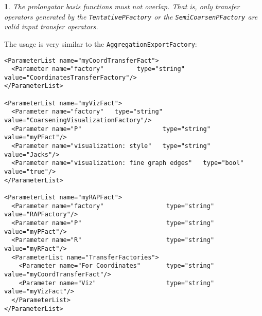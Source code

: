 \documentclass[10pt,fleqn]{book}
\newtheorem*{mycomment}{\ding{42}}
\begin{document}
\begin{mycomment}
The prolongator basis functions must not overlap. That is, only transfer operators generated by the \verb|TentativePFactory| or the \verb|SemiCoarsenPFactory| are valid input transfer operators.
\end{mycomment}

The usage is very similar to the \verb|AggregationExportFactory|:
\begin{lstlisting}
<ParameterList name="myCoordTransferFact">
  <Parameter name="factory"         type="string" value="CoordinatesTransferFactory"/>
</ParameterList>

<ParameterList name="myVizFact">
  <Parameter name="factory"   type="string" value="CoarseningVisualizationFactory"/>
  <Parameter name="P"                      type="string" value="myPFact"/>
  <Parameter name="visualization: style"   type="string" value="Jacks"/>
  <Parameter name="visualization: fine graph edges"   type="bool" value="true"/>
</ParameterList>

<ParameterList name="myRAPFact">
  <Parameter name="factory"                 type="string" value="RAPFactory"/>
  <Parameter name="P"                       type="string" value="myPFact"/>
  <Parameter name="R"                       type="string" value="myRFact"/>
  <ParameterList name="TransferFactories">
    <Parameter name="For Coordinates"       type="string" value="myCoordTransferFact"/>
    <Parameter name="Viz"                   type="string" value="myVizFact"/>
  </ParameterList>
</ParameterList>
\end{lstlisting}
\end{document}
